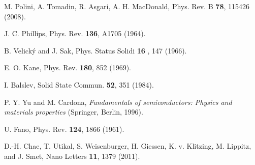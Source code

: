 \documentclass[reprint, superscriptaddress,  aps, pra]{revtex4-2}
\begin{document}
\begin{thebibliography}{99}
 M. Polini, A. Tomadin, R. Asgari, A. H. MacDonald, Phys.
Rev. B \textbf{78}, 115426 (2008).

 J. C. Phillips, Phys. Rev. \textbf{136}, A1705 (1964).

 B. Velick\'{y} and J. Sak, Phys. Status Solidi \textbf{16}%
, 147 (1966).

 E. O. Kane, Phys. Rev. \textbf{180}, 852 (1969).

 I. Balslev, Solid State Commun. \textbf{52}, 351 (1984).

 P. Y. Yu and M. Cardona, \textit{Fundamentals of
semiconductors: Physics and materials properties} (Springer, Berlin, 1996).

 U. Fano, Phys. Rev. \textbf{124}, 1866 (1961).

 D.-H. Chae, T. Utikal, S. Weisenburger, H. Giessen, K. v.
Klitzing, M. Lippitz, and J. Smet, Nano Letters \textbf{11}, 1379 (2011).
\end{thebibliography}
\end{document}

